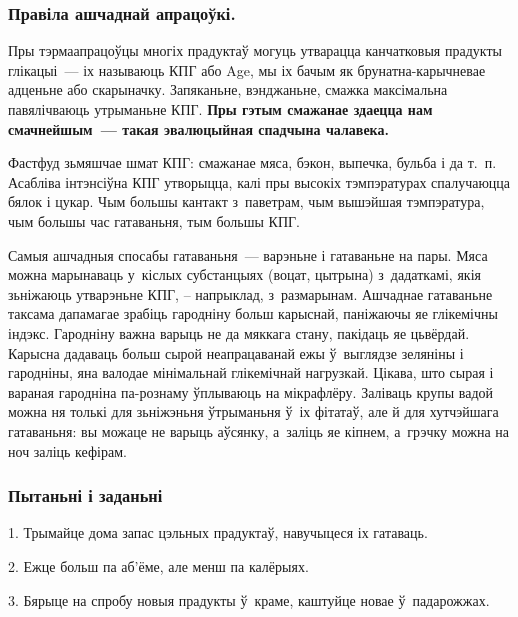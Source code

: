 
\subsubsection{Правіла ашчаднай апрацоўкі.}
Пры тэрмаапрацоўцы многіх прадуктаў могуць утварацца канчатковыя прадукты глікацыі~--- іх называюць КПГ або Age, мы іх бачым як брунатна-карычневае адценьне або скарыначку. Запяканьне, вэнджаньне, смажка максімальна павялічваюць утрыманьне КПГ. \textbf{Пры гэтым смажанае здаецца нам смачнейшым~--- такая эвалюцыйная спадчына чалавека.}

Фастфуд зьмяшчае шмат КПГ: смажанае мяса, бэкон, выпечка, бульба і да т.~п. Асабліва інтэнсіўна КПГ утворыцца, калі пры высокіх тэмпэратурах спалучаюцца бялок і цукар. Чым большы кантакт з~паветрам, чым вышэйшая тэмпэратура, чым большы час гатаваньня, тым большы КПГ. 


Самыя ашчадныя спосабы гатаваньня~--- варэньне і гатаваньне на пары. Мяса можна марынаваць у~кіслых субстанцыях (воцат, цытрына) з~дадаткамі, якія зьніжаюць утварэньне КПГ, -- напрыклад, з~размарынам. Ашчаднае гатаваньне таксама дапамагае зрабіць гародніну больш карыснай, паніжаючы яе глікемічны індэкс. Гародніну важна варыць не да мяккага стану, пакідаць яе цьвёрдай. Карысна дадаваць больш сырой неапрацаванай ежы ў~выглядзе зеляніны і гародніны, яна валодае мінімальнай глікемічнай нагрузкай. Цікава, што сырая і вараная гародніна па-рознаму ўплываюць на мікрафлёру. Заліваць крупы вадой можна ня толькі для зьніжэньня ўтрыманьня ў~іх фітатаў, але й для хутчэйшага гатаваньня: вы можаце не варыць аўсянку, а~заліць яе кіпнем, а~грэчку можна на ноч заліць кефірам.

\subsubsection{Пытаньні і заданьні}

1. Трымайце дома запас цэльных прадуктаў, навучыцеся іх гатаваць.

2. Ежце больш па аб'ёме, але менш па калёрыях.

3. Бярыце на спробу новыя прадукты ў~краме, каштуйце новае ў~падарожжах.


